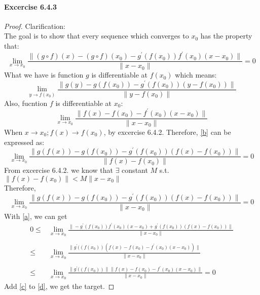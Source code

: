 \paragraph{Excercise 6.4.3}\begin{proof}Clarification:\\
The goal is to show that every sequence which converges to $x_{0}$ has the property that:
\[\lim_{x\rightarrow x_{0}}\frac{\|(g\circ f)(x)-(g\circ f)(x_{0})-g^\prime(f(x_{0}))f^\prime(x_{0})(x-x_{0})\|}{\|x-x_{0}\|}=0
\]
What we have is function $g$ is differentiable at $f(x_{0})$ which means:
\begin{equation}\label{a}
\lim_{y\rightarrow f(x_{0})}\frac{\|g(y)-g(f(x_{0}))-g^\prime(f(x_{0}))(y-f(x_{0}))\|}{\|y-f(x_{0})\|}
\end{equation}
Also, fucntion $f$ is differentiable at $x_{0}$:
\begin{equation}\label{b}
\lim_{x\rightarrow x_{0}}\frac{\|f(x)-f(x_{0})-f^\prime(x_{0})(x-x_{0})\|}{\|x-x_{0}\|}
\end{equation}
When $x\rightarrow x_{0}; f(x)\rightarrow f(x_{0})$, by excercise 6.4.2. Therefore, \ref{b} can be expressed as:
\[\lim_{x\rightarrow x_{0}}\frac{\|g(f(x))-g(f(x_{0}))-g^\prime(f(x_{0}))(f(x)-f(x_{0}))\|}{\|f(x)-f(x_{0})\|}=0
\]
From excercise 6.4.2. we know that $\exists$ constant $M$ s.t. $\|f(x)-f(x_{0})\|<M\|x-x_{0}\|$\\
Therefore,
\begin{equation}\label{d}\lim_{x\rightarrow x_{0}}\frac{\|g(f(x))-g(f(x_{0}))-g^\prime(f(x_{0}))(f(x)-f(x_{0}))\|}{\|x-x_{0}\|}=0
\end{equation}
With \ref{a}, we can get
\begin{align}
0\leq&\label{c}\lim_{x\rightarrow x_{0}}\frac{\|-g^\prime(f(x_{0}))f^\prime(x_{0})(x-x_{0})+g^\prime(f(x_{0}))(f(x)-f(x_{0}))\|}{\|x-x_{0}\|}\\\\
\leq&\lim_{x\rightarrow x_{0}}\frac{\|g^\prime((f(x_{0}))(f(x)-f(x_{0})-f^\prime(x_{0})(x-x_{0}))\|}{\|x-x_{0}\|}\\\\
\leq&\lim_{x\rightarrow x_{0}}\frac{\|g^\prime((f(x_{0}))\|\|f(x)-f(x_{0})-f^\prime(x_{0})(x-x_{0})\|}{\|x-x_{0}\|}=0
\end{align}
Add \ref{c} to \ref{d}, we get the target.
\end{proof}






